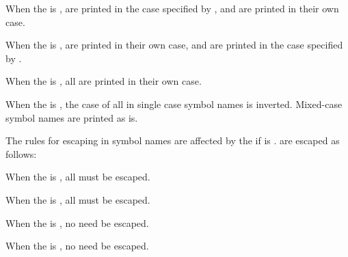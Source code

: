 \beginlist
{}

 When the  is ,
  
 are printed in the case specified by , and
   are printed in their own case.
 

 When the  is ,
   are printed in their own case, and
  
 are printed in the case specified by .
 

 When the  is ,
 all   are printed in their own case.
 

 When the  is ,
 the case of all   
 in single case symbol names is inverted.
 Mixed-case symbol names are printed as is.
\endlist 

The rules for escaping   in symbol names are affected by
the  if  is .
  are escaped as follows:                
\beginlist
{}

When the  is ,
all   must be escaped.


When the  is ,
all   must be escaped.


When the  is , 
no   need be escaped.


When the  is ,
no   need be escaped.

\endlist    


